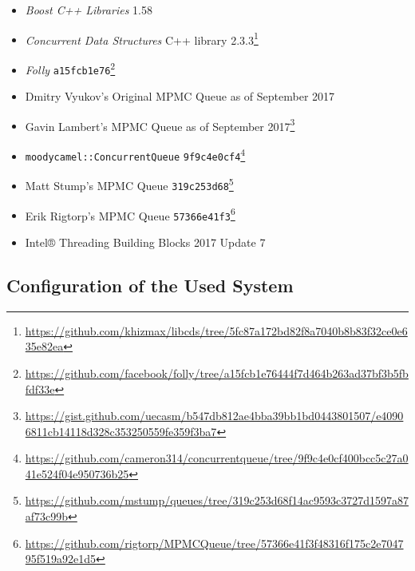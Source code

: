 \begin{@empty}
	\begin{itemize}
		\itemsep0em
		\item	\textit{Boost C++ Libraries} 1.58
		\item	\textit{Concurrent Data Structures} C++ library 2.3.3\footnote{\url{https://github.com/khizmax/libcds/tree/5fc87a172bd82f8a7040b8b83f32ce0e635e82ea}}
		\item	\textit{Folly} \lstinline{a15fcb1e76}\footnote{\url{https://github.com/facebook/folly/tree/a15fcb1e76444f7d464b263ad37bf3b5fbfdf33e}}
		\item	Dmitry Vyukov's Original MPMC Queue as of September 2017
		\item	Gavin Lambert's MPMC Queue as of September 2017\footnote{\url{https://gist.github.com/uecasm/b547db812ae4bba39bb1bd0443801507/e40906811cb14118d328c353250559fe359f3ba7}}
		\item	\lstinline{moodycamel::ConcurrentQueue} \lstinline{9f9c4e0cf4}\footnote{\url{https://github.com/cameron314/concurrentqueue/tree/9f9c4e0cf400bcc5c27a041e524f04e950736b25}}
		\item	Matt Stump's MPMC Queue \lstinline{319c253d68}\footnote{\url{https://github.com/mstump/queues/tree/319c253d68f14ac9593c3727d1597a87af73c99b}}
		\item	Erik Rigtorp's MPMC Queue \lstinline{57366e41f3}\footnote{\url{https://github.com/rigtorp/MPMCQueue/tree/57366e41f3f48316f175c2e704795f519a92e1d5}}
		\item	Intel® Threading Building Blocks 2017 Update 7
	\end{itemize}
\end{@empty}

\subsection[System Configuration]{Configuration of the Used System}

